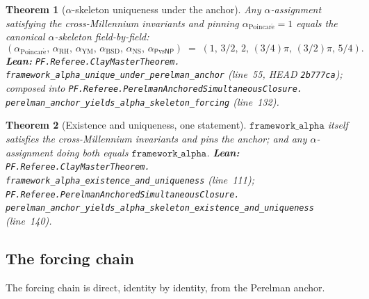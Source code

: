\documentclass[11pt,a4paper]{article}
\theoremstyle{plain}
\newtheorem{theorem}{Theorem}[section]
\theoremstyle{definition}
\begin{document}
\begin{theorem}[$\alpha$-skeleton uniqueness under the anchor]
\label{thm:alpha-forcing}
Any $\alpha$-assignment satisfying the cross-Millennium invariants
and pinning $\alpha_{\mathrm{Poincar\acute e}} = 1$ equals the
canonical $\alpha$-skeleton field-by-field:
\[
(\alpha_{\mathrm{Poincar\acute e}},\, \alpha_{\mathrm{RH}},\,
\alpha_{\mathrm{YM}},\, \alpha_{\mathrm{BSD}},\,
\alpha_{\mathrm{NS}},\, \alpha_{\mathsf{P}\mathrm{vs}\mathsf{NP}})
\;=\;
(1,\, 3/2,\, 2,\, (3/4)\pi,\, (3/2)\pi,\, 5/4).
\]
\textbf{Lean:}
\texttt{PF.Referee.ClayMasterTheorem.\\
framework\_alpha\_unique\_under\_perelman\_anchor}
(line~55, HEAD \texttt{2b777ca}); composed into
\texttt{PF.Referee.PerelmanAnchoredSimultaneousClosure.\\
perelman\_anchor\_yields\_alpha\_skeleton\_forcing}
(line~132).
\end{theorem}

\begin{theorem}[Existence and uniqueness, one statement]
\label{thm:alpha-exists-unique}
$\mathtt{framework\_alpha}$ itself satisfies the cross-Millennium
invariants and pins the anchor; and any $\alpha$-assignment doing
both equals $\mathtt{framework\_alpha}$.
\textbf{Lean:}
\texttt{PF.Referee.ClayMasterTheorem.\\
framework\_alpha\_existence\_and\_uniqueness}
(line~111);
\texttt{PF.Referee.PerelmanAnchoredSimultaneousClosure.\\
perelman\_anchor\_yields\_alpha\_skeleton\_existence\_and\_uniqueness}
(line~140).
\end{theorem}

\subsection{The forcing chain}
\label{sec:forcing-chain}

The forcing chain is direct, identity by identity, from the
Perelman anchor.
\end{document}
